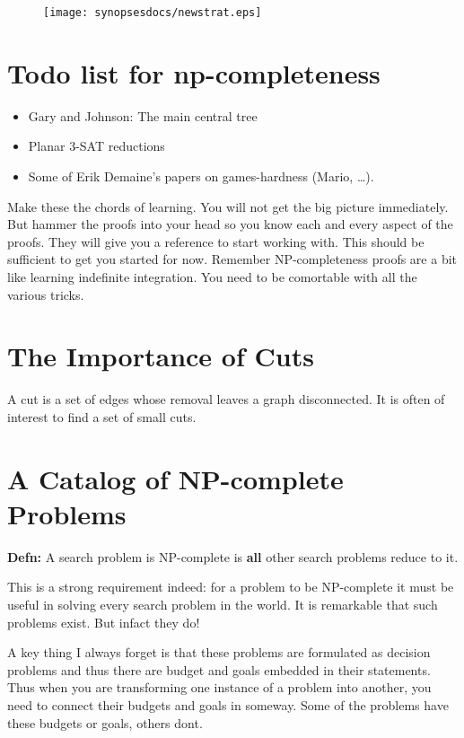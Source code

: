 \begin{figure}[h]
\centering
\texttt{[image: synopsesdocs/newstrat.eps]}
\end{figure}

\section{Todo list for np-completeness}
\label{sec:orgadab17e}

\begin{itemize}
\item Gary and Johnson: The main central tree
\item Planar 3-SAT reductions
\item Some of Erik Demaine's papers on games-hardness (Mario, \ldots{}).
\end{itemize}

Make these the chords of learning. You will not get the big picture immediately. But 
hammer the proofs into your head so you know each and every aspect of the proofs. They
will give you a reference to start working with. This should be sufficient to get you started
for now. Remember NP-completeness proofs are a bit like learning indefinite integration.
You need to be comortable with all the various tricks.
\section{The Importance of Cuts}
\label{sec:orgde61d5a}
A cut is a set of edges whose removal leaves a graph disconnected. It is often 
of interest to find a set of small cuts. 

\section{A Catalog of NP-complete Problems}
\label{sec:org59af7fa}

\textbf{Defn:} A search problem is NP-complete is \textbf{all} other search problems reduce to it. 

This is a strong requirement indeed: for a problem to be NP-complete it must be useful 
in solving every search problem in the world. It is remarkable that such problems exist. 
But infact they do!

A key thing I always forget is that these problems are formulated as decision problems
and thus there are budget and goals embedded in their statements. Thus when you are transforming 
one instance of a problem into another, you need to connect their budgets and goals in someway. 
Some of the problems have these budgets or goals, others dont. 

